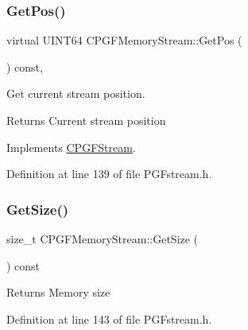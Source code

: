 \subsubsection{\texorpdfstring{GetPos()}{GetPos()}}
{\footnotesize\ttfamily virtual U\+I\+N\+T64 C\+P\+G\+F\+Memory\+Stream\+::\+Get\+Pos (\begin{DoxyParamCaption}{ }\end{DoxyParamCaption}) const\hspace{0.3cm}{\ttfamily [inline]}, {\ttfamily [virtual]}}

Get current stream position. \begin{DoxyReturn}{Returns}
Current stream position 
\end{DoxyReturn}


Implements \mbox{\hyperlink{classCPGFStream_a841e109647ea77dd9e589ab00ef4aad8}{C\+P\+G\+F\+Stream}}.



Definition at line 139 of file P\+G\+Fstream.\+h.


\begin{DoxyCode}{0}

\end{DoxyCode}
\mbox{\label{classCPGFMemoryStream_a44170277f36028bbff876fd6ebaeef21}} 
\subsubsection{\texorpdfstring{GetSize()}{GetSize()}}
{\footnotesize\ttfamily size\+\_\+t C\+P\+G\+F\+Memory\+Stream\+::\+Get\+Size (\begin{DoxyParamCaption}{ }\end{DoxyParamCaption}) const\hspace{0.3cm}{\ttfamily [inline]}}

\begin{DoxyReturn}{Returns}
Memory size 
\end{DoxyReturn}


Definition at line 143 of file P\+G\+Fstream.\+h.


